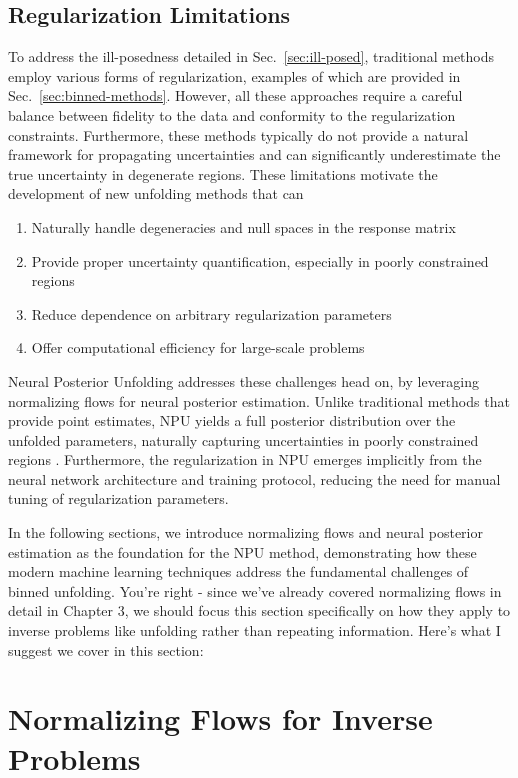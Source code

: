 \subsection{Regularization Limitations}
    To address the ill-posedness detailed in Sec.~\ref{sec:ill-posed}, traditional methods employ various forms of regularization, examples of which are provided in Sec.~\ref{sec:binned-methods}.
    However, all these approaches require a careful balance between fidelity to the data and conformity to the regularization constraints.
    Furthermore, these methods typically do not provide a natural framework for propagating uncertainties and can significantly underestimate the true uncertainty in degenerate regions.
    These limitations motivate the development of new unfolding methods that can
    \begin{enumerate}
        \item Naturally handle degeneracies and null spaces in the response matrix
        \item Provide proper uncertainty quantification, especially in poorly constrained regions
        \item Reduce dependence on arbitrary regularization parameters
        \item Offer computational efficiency for large-scale problems
    \end{enumerate}
    Neural Posterior Unfolding addresses these challenges head on, by leveraging normalizing flows for neural posterior estimation.
    Unlike traditional methods that provide point estimates, NPU yields a full posterior distribution over the unfolded parameters, naturally capturing uncertainties in poorly constrained regions . 
    Furthermore, the regularization in NPU emerges implicitly from the neural network architecture and training protocol, reducing the need for manual tuning of regularization parameters.

    In the following sections, we introduce normalizing flows and neural posterior estimation as the foundation for the NPU method, demonstrating how these modern machine learning techniques address the fundamental challenges of binned unfolding.
You're right - since we've already covered normalizing flows in detail in Chapter 3, we should focus this section specifically on how they apply to inverse problems like unfolding rather than repeating information. Here's what I suggest we cover in this section:

\section{Normalizing Flows for Inverse Problems}
